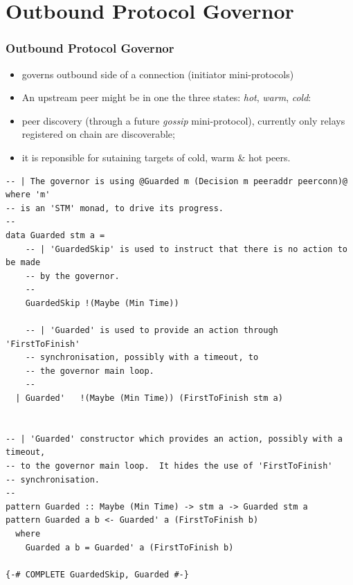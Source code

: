 \documentclass[t,dvipsnames,hyperref={colorlinks,citecolor=NavyBlue,linkcolor=NavyBlue,anchorcolor=NavyBlue,urlcolor=NavyBlue}]{beamer}
\begin{document}
\section{Outbound Protocol Governor}

\begin{frame}
  \frametitle{Outbound Protocol Governor}
  \begin{itemize}
    \item[\bullet] governs outbound side of a connection (initiator mini-protocols)
    \item[\bullet] An upstream peer might be in one the three states: \textit{hot}, \textit{warm}, \textit{cold}:
    \item[\bullet] peer discovery (through a future \textit{gossip}
      mini-protocol), currently only relays registered on chain are discoverable;
    \item[\bullet] it is reponsible for sutaining targets of cold, warm \& hot
      peers.
  \end{itemize}
\end{frame}

\begin{frame}[fragile]
  \begin{verbatim}
-- | The governor is using @Guarded m (Decision m peeraddr peerconn)@ where 'm'
-- is an 'STM' monad, to drive its progress.
--
data Guarded stm a =
    -- | 'GuardedSkip' is used to instruct that there is no action to be made
    -- by the governor.
    --
    GuardedSkip !(Maybe (Min Time))

    -- | 'Guarded' is used to provide an action through 'FirstToFinish'
    -- synchronisation, possibly with a timeout, to
    -- the governor main loop.
    --
  | Guarded'   !(Maybe (Min Time)) (FirstToFinish stm a)


-- | 'Guarded' constructor which provides an action, possibly with a timeout,
-- to the governor main loop.  It hides the use of 'FirstToFinish'
-- synchronisation.
--
pattern Guarded :: Maybe (Min Time) -> stm a -> Guarded stm a
pattern Guarded a b <- Guarded' a (FirstToFinish b)
  where
    Guarded a b = Guarded' a (FirstToFinish b)

{-# COMPLETE GuardedSkip, Guarded #-}

  \end{verbatim}
\end{frame}
\end{document}
